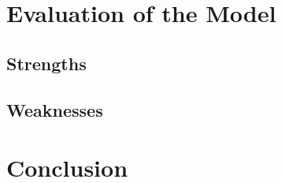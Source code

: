 \documentclass{HZNUMCM}
\begin{document}
  \section{Evaluation of the Model}
    \subsection{Strengths}
    \subsection{Weaknesses}

  \section{Conclusion}


  
\end{document}
